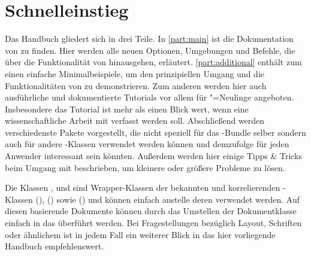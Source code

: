 \section{Schnelleinstieg}
Das Handbuch gliedert sich in drei Teile. In \autoref{part:main} ist die 
Dokumentation von \TUDScript zu finden. Hier werden alle neuen Optionen, 
Umgebungen und Befehle, die über die Funktionalität von \KOMAScript{} 
hinausgehen, erläutert. \autoref{part:additional} enthält zum einen einfache 
Minimalbeispiele, um den prinzipiellen Umgang und die Funktionalitäten von 
\TUDScript zu demonstrieren. Zum anderen werden hier auch ausführliche und 
dokumentierte Tutorials vor allem für "=Neulinge angeboten. 
Insbesondere das Tutorial  ist mehr als einen Blick wert, 
wenn eine wissenschaftliche Arbeit mit  verfasst werden soll.
Abschließend werden verschiedenste Pakete vorgestellt, die nicht speziell für 
das \TUDScript-Bundle selber sondern auch für andere -Klassen
verwendet werden können und demzufolge für jeden Anwender interessant sein 
könnten. Außerdem werden hier einige Tipps \& Tricks beim Umgang mit 
 beschrieben, um kleinere oder größere Probleme zu lösen.

Die Klassen ,  und  
sind Wrapper-Klassen der bekannten und korrelierenden \KOMAScript-Klassen 
(), () 
sowie () und können einfach anstelle deren 
verwendet werden. Auf diesen basierende Dokumente können durch das Umstellen 
der Dokumentklasse einfach in das \TUDCD überführt werden. Bei Fragestellungen 
bezüglich Layout, Schriften oder ähnlichem ist in jedem Fall ein weiterer Blick
in das hier vorliegende Handbuch empfehlenswert.
